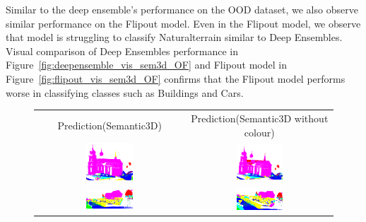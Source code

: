     Similar to the deep ensemble's performance on the OOD dataset, we also observe similar performance on the Flipout model.
    Even in the Flipout model, we observe that model is struggling to classify Naturalterrain similar to Deep Ensembles.
    Visual comparison of Deep Ensembles performance in Figure~\ref{fig:deepensemble_vis_sem3d_OF} and Flipout model in Figure~\ref{fig:flipout_vis_sem3d_OF} confirms that the Flipout model performs worse in classifying classes such as Buildings and Cars.
    \begin{figure}[h!]
        \centering
        \begin{tabular}{cc}
            Prediction(Semantic3D) & Prediction(Semantic3D without colour) \\
            \includegraphics[width=0.33\textwidth, height=0.18\textheight]{images/ood_imgs/fout_sem3d/fout_1.pdf}&
            \includegraphics[width=0.33\textwidth, height=0.18\textheight]{images/sem3d_of/fout_sem3d_of_1.pdf}\\

            \includegraphics[width=0.33\textwidth, height=0.18\textheight]{images/ood_imgs/fout_sem3d/fout_2.pdf}&
            \includegraphics[width=0.33\textwidth, height=0.18\textheight]{images/sem3d_of/fout_sem3d_of_2.pdf}\\


\end{tabular}
\end{figure}
